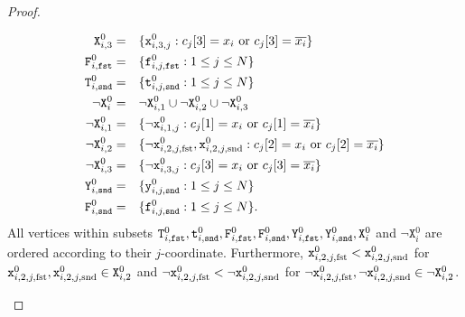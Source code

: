 \begin{proof}
\begin{mdframed}
\begin{alignat*}{2}
      \texttt{X}^{0}_{i,3}
      &=
      &&\{\texttt{x}^{0}_{i,3,j} : \text{$c_{j}[3] = x_{i}$ or $c_{j}[3] = \overline{x_{i}}$}\}
      \\
      \texttt{F}^{0}_{i,\texttt{fst}}
      &=
      &&\{\texttt{f}^{0}_{i,j,\texttt{fst}} : 1 \leq j \leq N\}
      \\
      \texttt{T}^{0}_{i,\texttt{snd}}
      &=
      &&\{\texttt{t}^{0}_{i,j,\texttt{snd}} : 1 \leq j \leq N\}
      \\
      \neg\texttt{X}^{0}_{i}
      &=
      &&\neg\texttt{X}^{0}_{i,1} \cup \neg\texttt{X}^{0}_{i,2} \cup \neg\texttt{X}^{0}_{i,3}
      \\
      \neg\texttt{X}^{0}_{i,1}
      &=
      &&\{\neg\texttt{x}^{0}_{i,1,j} :
      \text{$c_{j}[1] = x_{i}$ or $c_{j}[1] = \overline{x_{i}}$}\}
      \\
      \neg\texttt{X}^{0}_{i,2}
      &=
      &&\{\neg\texttt{x}^{0}_{i,2,j,\text{fst}}, \texttt{x}^{0}_{i,2,j,\text{snd}} :
      \text{$c_{j}[2] = x_{i}$ or $c_{j}[2] = \overline{x_{i}}$}\}
      \\
      \neg\texttt{X}^{0}_{i,3}
      &=
      &&\{\neg\texttt{x}^{0}_{i,3,j} :
      \text{$c_{j}[3] = x_{i}$ or $c_{j}[3] = \overline{x_{i}}$}\}
      \\
      \texttt{Y}^{0}_{i,\texttt{snd}}
      &=
      &&\{\texttt{y}^{0}_{i,j,\texttt{snd}} : 1 \leq j \leq N\}
      \\
      \texttt{F}^{0}_{i,\texttt{snd}}
      &=
      &&\{\texttt{f}^{0}_{i,j,\texttt{snd}} : 1 \leq j \leq N\}\text{.}
    \end{alignat*}
    All vertices within subsets
    $\texttt{T}^{0}_{i,\texttt{fst}}, \texttt{t}^{0}_{i,\texttt{snd}},
    \texttt{F}^{0}_{i,\texttt{fst}}, \texttt{F}^{0}_{i,\texttt{snd}},
    \texttt{Y}^{0}_{i,\texttt{fst}}, \texttt{Y}^{0}_{i,\texttt{snd}},
    \texttt{X}^{0}_{i}$ and $\neg\texttt{X}^{0}_{i}$
    are ordered according to their $j$-coordinate.
    Furthermore,
    $\texttt{x}^{0}_{i,2,j,\text{fst}} < \texttt{x}^{0}_{i,2,j,\text{snd}}$
    for $\texttt{x}^{0}_{i,2,j,\text{fst}}, \texttt{x}^{0}_{i,2,j,\text{snd}} \in \texttt{X}^{0}_{i,2}$
    and
    $\neg\texttt{x}^{0}_{i,2,j,\text{fst}} < \neg\texttt{x}^{0}_{i,2,j,\text{snd}}$
    for $\neg\texttt{x}^{0}_{i,2,j,\text{fst}}, \neg\texttt{x}^{0}_{i,2,j,\text{snd}} \in \neg\texttt{X}^{0}_{i,2}$.


\end{mdframed}
\end{proof}
